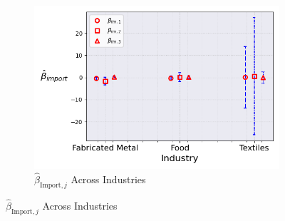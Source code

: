 \documentclass{article}
\begin{document}
\begin{figure}[ht!]
\begin{subfigure}[t]{0.32\textwidth}
        \includegraphics[width=\textwidth]{figure/stationary_mixture_kmshare_ciiu_beta_im_across_industries_m3.png}
        \caption{$\hat{\beta}_{\text{Import},j}$ Across Industries}
    \end{subfigure}
\end{figure}
\end{document}
